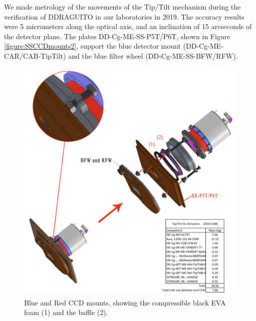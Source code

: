\documentclass{report}
\begin{document}
We made metrology of the movements of the Tip/Tilt mechanism during the verification of DDRAGUITO in our laboratories in 2019. The accuracy results were 5 micrometers along the optical axis, and an inclination of 15 arcseconds of the detector plane. The plates DD-Cg-ME-SS-P5T/P6T, shown in Figure \ref{figure:SSCCDmounts2}, support the blue detector mount (DD-Cg-ME-CAR/CAB-TipTilt) and the blue filter wheel (DD-Cg-ME-SS-BFW/RFW). 


\begin{figure}
\centering
\includegraphics[width=1\linewidth]{figures/SSCCDmounts.png}
\caption{Blue and Red CCD mounts, showing the compressible black EVA foam (1) and the baffle (2).}
\label{figure:SSCCDmounts}
\end{figure}
\end{document}

